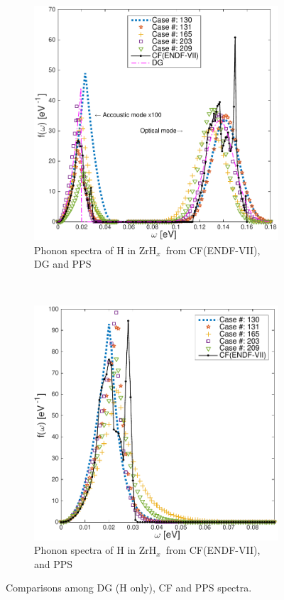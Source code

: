 \documentclass[review]{elsarticle}
\newcommand{\zh}{ZrH$_x$}
\begin{document}
\begin{figure}[ht!]
\begin{subfigure}{0.5\textwidth}
\centering
\hspace*{-3.5cm}\includegraphics[width=1.4\linewidth]{NSE15-48R1_Figure2a.pdf}
\caption{Phonon spectra of H in \zh~from CF(ENDF-VII), DG and PPS}
\label{fg:pph}
\end{subfigure}
~
\begin{subfigure}{0.5\textwidth}
\centering
\hspace*{-.5cm}\includegraphics[width=1.4\linewidth]{NSE15-48R1_Figure2b.pdf}
\caption{Phonon spectra of H in \zh~from CF(ENDF-VII),  and PPS}
\label{fg:ppz}
\end{subfigure}
\caption{Comparisons among DG (H only), CF and PPS spectra.}
\label{fg:ps}
\end{figure}
\end{document}
